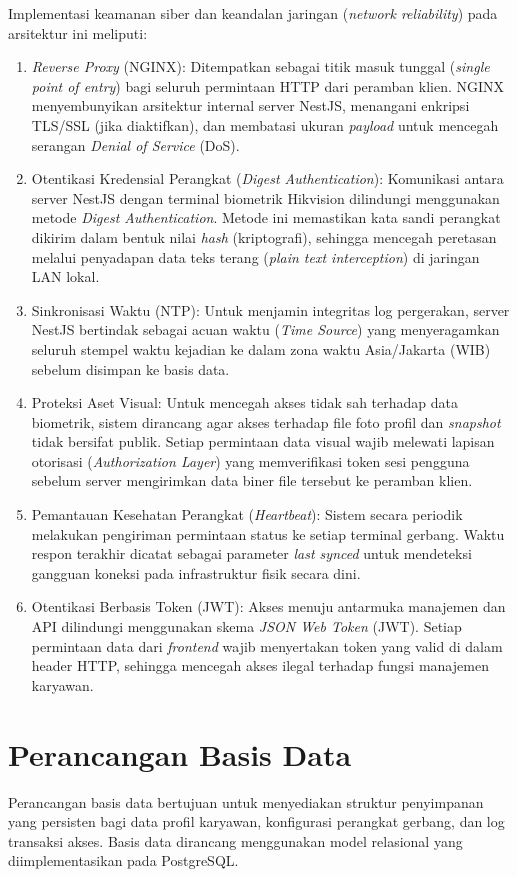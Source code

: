 Implementasi keamanan siber dan keandalan jaringan (\textit{network reliability}) pada arsitektur ini meliputi:
\begin{enumerate}
    \item \textit{Reverse Proxy} (NGINX): Ditempatkan sebagai titik masuk tunggal (\textit{single point of entry}) bagi seluruh permintaan HTTP dari peramban klien. NGINX menyembunyikan arsitektur internal server NestJS, menangani enkripsi TLS/SSL (jika diaktifkan), dan membatasi ukuran \textit{payload} untuk mencegah serangan \textit{Denial of Service} (DoS).
    \item Otentikasi Kredensial Perangkat (\textit{Digest Authentication}): Komunikasi antara server NestJS dengan terminal biometrik Hikvision dilindungi menggunakan metode \textit{Digest Authentication}. Metode ini memastikan kata sandi perangkat dikirim dalam bentuk nilai \textit{hash} (kriptografi), sehingga mencegah peretasan melalui penyadapan data teks terang (\textit{plain text interception}) di jaringan LAN lokal.
    \item Sinkronisasi Waktu (NTP): Untuk menjamin integritas log pergerakan, server NestJS bertindak sebagai acuan waktu (\textit{Time Source}) yang menyeragamkan seluruh stempel waktu kejadian ke dalam zona waktu Asia/Jakarta (WIB) sebelum disimpan ke basis data.
    \item Proteksi Aset Visual: Untuk mencegah akses tidak sah terhadap data biometrik, sistem dirancang agar akses terhadap file foto profil dan \textit{snapshot} tidak bersifat publik. Setiap permintaan data visual wajib melewati lapisan otorisasi (\textit{Authorization Layer}) yang memverifikasi token sesi pengguna sebelum server mengirimkan data biner file tersebut ke peramban klien.
    \item Pemantauan Kesehatan Perangkat (\textit{Heartbeat}): Sistem secara periodik melakukan pengiriman permintaan status ke setiap terminal gerbang. Waktu respon terakhir dicatat sebagai parameter \textit{last synced} untuk mendeteksi gangguan koneksi pada infrastruktur fisik secara dini.
    \item Otentikasi Berbasis Token (JWT): Akses menuju antarmuka manajemen dan API dilindungi menggunakan skema \textit{JSON Web Token} (JWT). Setiap permintaan data dari \textit{frontend} wajib menyertakan token yang valid di dalam header HTTP, sehingga mencegah akses ilegal terhadap fungsi manajemen karyawan.
\end{enumerate}

\section{Perancangan Basis Data}
Perancangan basis data bertujuan untuk menyediakan struktur penyimpanan yang persisten bagi data profil karyawan, konfigurasi perangkat gerbang, dan log transaksi akses. Basis data dirancang menggunakan model relasional yang diimplementasikan pada PostgreSQL.

